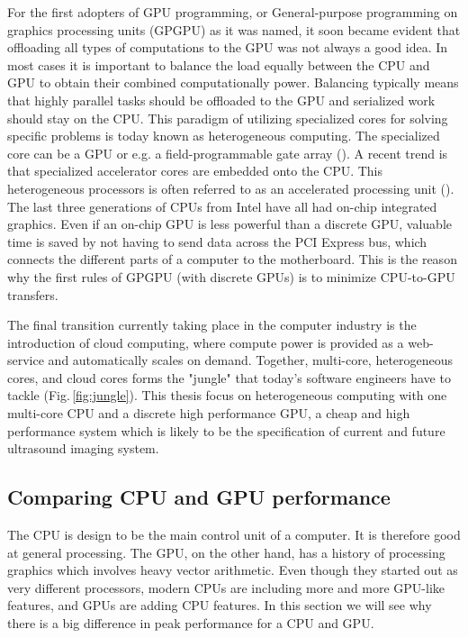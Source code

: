 For the first adopters of GPU programming, or General-purpose programming on graphics processing units (GPGPU) as it was named, it soon became evident that offloading all types of computations to the GPU was not always a good idea. In most cases it is important to balance the load equally between the CPU and GPU to obtain their combined computationally power. Balancing typically means that highly parallel tasks should be offloaded to the GPU and serialized work should stay on the CPU. This paradigm of utilizing specialized cores for solving specific problems is today known as heterogeneous computing. The specialized core can be a GPU or e.g. a field-programmable gate array (). A recent trend is that specialized accelerator cores are embedded onto the CPU. This heterogeneous processors is often referred to as an accelerated processing unit (). The last three generations of CPUs from Intel have all had on-chip integrated graphics. Even if an on-chip GPU is less powerful than a discrete GPU, valuable time is saved by not having to send data across the PCI Express bus, which connects the different parts of a computer to the motherboard. This is the reason why the first rules of GPGPU (with discrete GPUs) is to minimize CPU-to-GPU transfers. 

The final transition currently taking place in the computer industry is the introduction of cloud computing, where compute power is provided as a web-service and automatically scales on demand. Together, multi-core, heterogeneous cores, and cloud cores forms the "jungle" that today's software engineers have to tackle (Fig.\,\ref{fig:jungle}). This thesis focus on heterogeneous computing with one multi-core CPU and a discrete high performance GPU, a cheap and high performance system which is likely to be the specification of current and future ultrasound imaging system.

\subsection{Comparing CPU and GPU performance}\label{sec:cpu_vs_gpu}
The CPU is design to be the main control unit of a computer. It is therefore good at general processing. The GPU, on the other hand, has a history of processing graphics which involves heavy vector arithmetic. Even though they started out as very different processors, modern CPUs are including more and more GPU-like features, and GPUs are adding CPU features. In this section we will see why there is a big difference in peak performance for a CPU and GPU.

